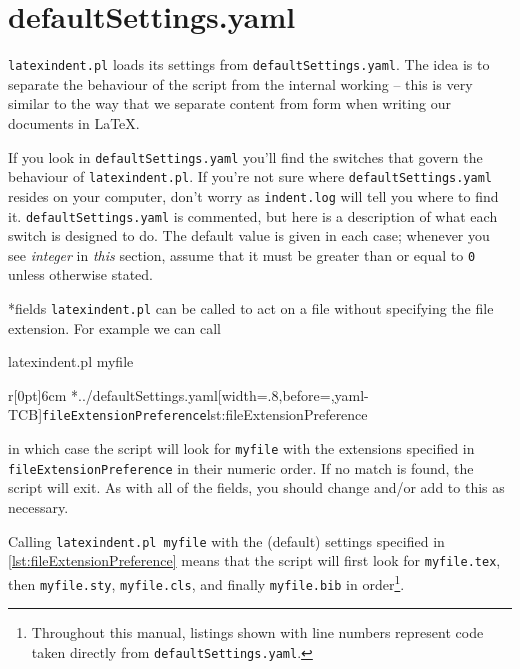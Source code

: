 \section{defaultSettings.yaml}\label{sec:defuseloc}
 \texttt{latexindent.pl} loads its settings from \texttt{defaultSettings.yaml}. The idea is to separate the behaviour of the script
 from the internal working -- this is very similar to the way that we separate content
 from form when writing our documents in \LaTeX.

 If you look in \texttt{defaultSettings.yaml} you'll find the switches
 that govern the behaviour of \texttt{latexindent.pl}. If you're not sure where
 \texttt{defaultSettings.yaml} resides on your computer, don't worry as \texttt{indent.log}
 will tell you where to find it.
 \texttt{defaultSettings.yaml} is commented,
 but here is a description of what each switch is designed to do. The default
 value is given in each case; whenever you see \emph{integer} in \emph{this}
 section, assume that it must be greater than or equal to \texttt{0} unless
 otherwise stated.

*{fields}
	\texttt{latexindent.pl} can be called to
	act on a file without
	specifying the file extension.  For example we can call
	\begin{commandshell}
latexindent.pl myfile
\end{commandshell}
	\begin{wrapfigure}[8]{r}[0pt]{6cm}
		\cmhlistingsfromfile[style=fileExtensionPreference]*{../defaultSettings.yaml}[width=.8\linewidth,before=\centering,yaml-TCB]{\texttt{fileExtensionPreference}}{lst:fileExtensionPreference}
	\end{wrapfigure}

	in which case the script will look for \texttt{myfile} with the extensions
	specified in \texttt{fileExtensionPreference} in their numeric order. If
	no match is found, the script will exit. As with all of the fields, you should
	change and/or add to this as necessary.

	Calling \texttt{latexindent.pl myfile} with the (default) settings specified in \cref{lst:fileExtensionPreference}
	means that the script will first look for \texttt{myfile.tex}, then \texttt{myfile.sty}, \texttt{myfile.cls},
	and finally \texttt{myfile.bib} in order\footnote{Throughout this manual, listings shown with line numbers represent code
		taken directly from \texttt{defaultSettings.yaml}.}.

